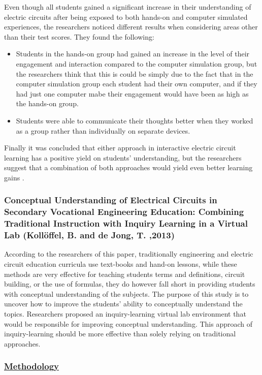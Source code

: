 \documentclass[../main.tex]{subfiles}
\begin{document}
Even though all students gained a significant increase in their understanding of electric circuits after being exposed to both hands-on and computer simulated experiences, the researchers noticed different results when considering areas other than their test scores. They found the following:
\begin{itemize}
    \item Students in the hands-on group had gained an increase in the level of their engagement and interaction compared to the computer simulation group, but the researchers think that this is could be simply due to the fact that in the computer simulation group each student had their own computer, and if they had just one computer mabe their engagement would have been as high as the hands-on group.

    \item Students were able to communicate their thoughts better when they worked as a group rather than individually on separate devices.
\end{itemize}
Finally it was concluded that either approach in interactive electric circuit learning has a positive yield on students’ understanding, but the researchers suggest that a combination of both approaches would yield even better learning gains \cite{24}.

\subsubsection{Conceptual Understanding of Electrical Circuits in Secondary Vocational Engineering Education: Combining Traditional Instruction with Inquiry Learning in a Virtual Lab (Kollöffel, B. and de Jong, T. ,2013)}

According to the researchers of this paper, traditionally engineering and electric circuit education curricula use text-books and hand-on lessons, while these methods are very effective for teaching students terms and definitions, circuit building, or the use of formulas, they do however fall short in providing students with conceptual understanding of the subjects.
The purpose of this study is to uncover how to improve the students’ ability to conceptually understand the topics. Researchers proposed an inquiry-learning virtual lab environment that would be responsible for improving conceptual understanding. This approach of inquiry-learning should be more effective than solely relying on traditional approaches.

\subsubsection*{\underline{Methodology}}
\end{document}
